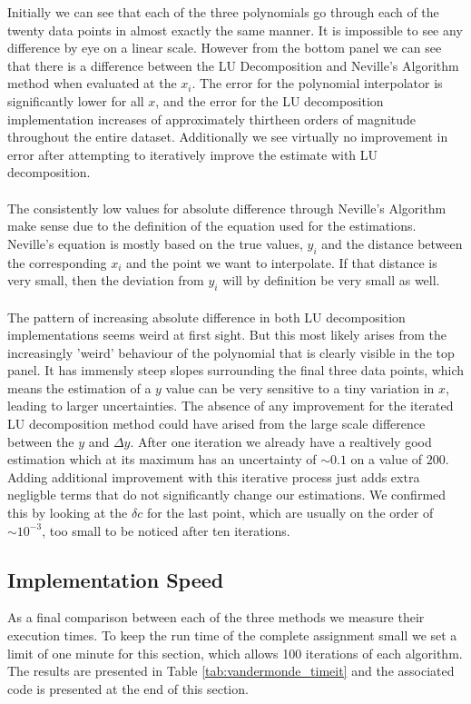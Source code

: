 Initially we can see that each of the three polynomials go through each of the twenty data points in almost exactly the same manner. It is impossible to see any difference by eye on a linear scale. However from the bottom panel we can see that there is a difference between the LU Decomposition and Neville's Algorithm method when evaluated at the $x_i$. The error for the polynomial interpolator is significantly lower for all $x$, and the error for the LU decomposition implementation increases of approximately thirtheen orders of magnitude throughout the entire dataset. Additionally we see virtually no improvement in error after attempting to iteratively improve the estimate with LU decomposition.
\\ \\
The consistently low values for absolute difference through Neville's Algorithm make sense due to the definition of the equation used for the estimations. Neville's equation is mostly based on the true values, $y_i$ and the distance between the corresponding $x_i$ and the point we want to interpolate. If that distance is very small, then the deviation from $y_i$ will by definition be very small as well. 
\\ \\
The pattern of increasing absolute difference in both LU decomposition implementations seems weird at first sight. But this most likely arises from the increasingly 'weird' behaviour of the polynomial that is clearly visible in the top panel. It has immensly steep slopes surrounding the final three data points, which means the estimation of a $y$ value can be very sensitive to a tiny variation in $x$, leading to larger uncertainties. The absence of any improvement for the iterated LU decomposition method could have arised from the large scale difference between the $y$ and $\Delta y$. After one iteration we already have a realtively good estimation which at its maximum has an uncertainty of $\sim 0.1$ on a value of $200$. Adding additional improvement with this iterative process just adds extra negligble terms that do not significantly change our estimations. We confirmed this by looking at the $\delta c$ for the last point, which are usually on the order of $\sim 10^{-3}$, too small to be noticed after ten iterations.

\subsection{Implementation Speed}

As a final comparison between each of the three methods we measure their execution times. To keep the run time of the complete assignment small we set a limit of one minute for this section, which allows 100 iterations of each algorithm. The results are presented in Table \ref{tab:vandermonde_timeit} and the associated code is presented at the end of this section.

